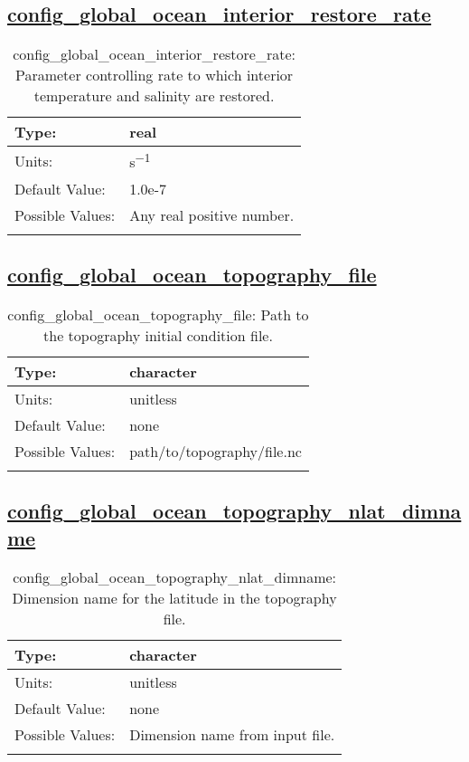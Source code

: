 \subsection[config\_global\_ocean\_interior\_restore\_rate]{\hyperref[sec:nm_tab_global_ocean]{config\_global\_ocean\_interior\_restore\_rate}}
\label{subsec:nm_sec_config_global_ocean_interior_restore_rate}
\begin{center}
\begin{longtable}{| p{2.0in} || p{4.0in} |}
    \hline
    Type: & real \\
    \hline
    Units: & \si{s^{-1}} \\
    \hline
    Default Value: & 1.0e-7 \\
    \hline
    Possible Values: & Any real positive number. \\
    \hline
    \caption{config\_global\_ocean\_interior\_restore\_rate: Parameter controlling rate to which interior temperature and salinity are restored.}
\end{longtable}
\end{center}
\subsection[config\_global\_ocean\_topography\_file]{\hyperref[sec:nm_tab_global_ocean]{config\_global\_ocean\_topography\_file}}
\label{subsec:nm_sec_config_global_ocean_topography_file}
\begin{center}
\begin{longtable}{| p{2.0in} || p{4.0in} |}
    \hline
    Type: & character \\
    \hline
    Units: & \si{unitless} \\
    \hline
    Default Value: & none \\
    \hline
    Possible Values: & path/to/topography/file.nc \\
    \hline
    \caption{config\_global\_ocean\_topography\_file: Path to the topography initial condition file.}
\end{longtable}
\end{center}
\subsection[config\_global\_ocean\_topography\_nlat\_dimname]{\hyperref[sec:nm_tab_global_ocean]{config\_global\_ocean\_topography\_nlat\_dimname}}
\label{subsec:nm_sec_config_global_ocean_topography_nlat_dimname}
\begin{center}
\begin{longtable}{| p{2.0in} || p{4.0in} |}
    \hline
    Type: & character \\
    \hline
    Units: & \si{unitless} \\
    \hline
    Default Value: & none \\
    \hline
    Possible Values: & Dimension name from input file. \\
    \hline
    \caption{config\_global\_ocean\_topography\_nlat\_dimname: Dimension name for the latitude in the topography file.}
\end{longtable}
\end{center}
